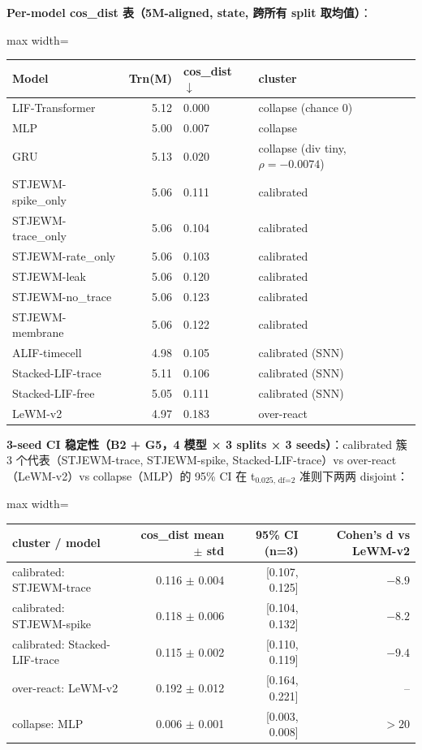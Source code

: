 \documentclass[11pt,a4paper]{article}
\begin{document}
\textbf{Per-model cos\_dist 表（5M-aligned, state, 跨所有 split 取均值）}：

\begin{adjustbox}{max width=\textwidth}
\scriptsize
\begin{tabular}{lrll}
\toprule
\textbf{Model} & \textbf{Trn(M)} & \textbf{cos\_dist $\downarrow$} & \textbf{cluster} \\
\midrule
LIF-Transformer & 5.12 & 0.000 & collapse (chance 0) \\
MLP & 5.00 & 0.007 & collapse \\
GRU & 5.13 & 0.020 & collapse (div tiny, $\rho=-0.0074$) \\
\midrule
STJEWM-spike\_only & 5.06 & 0.111 & calibrated \\
STJEWM-trace\_only & 5.06 & 0.104 & calibrated \\
STJEWM-rate\_only & 5.06 & 0.103 & calibrated \\
STJEWM-leak & 5.06 & 0.120 & calibrated \\
STJEWM-no\_trace & 5.06 & 0.123 & calibrated \\
STJEWM-membrane & 5.06 & 0.122 & calibrated \\
ALIF-timecell & 4.98 & 0.105 & calibrated (SNN) \\
Stacked-LIF-trace & 5.11 & 0.106 & calibrated (SNN) \\
Stacked-LIF-free & 5.05 & 0.111 & calibrated (SNN) \\
\midrule
LeWM-v2 & 4.97 & 0.183 & over-react \\
\bottomrule
\end{tabular}
\end{adjustbox}

\textbf{3-seed CI 稳定性（B2 + G5，4 模型 × 3 splits × 3 seeds）}：calibrated 簇 3 个代表（STJEWM-trace, STJEWM-spike, Stacked-LIF-trace）vs over-react（LeWM-v2）vs collapse（MLP）的 95\% CI 在 t$_{\text{0.025, df=2}}$ 准则下两两 disjoint：

\begin{adjustbox}{max width=\textwidth}
\scriptsize
\begin{tabular}{lrrr}
\toprule
\textbf{cluster / model} & \textbf{cos\_dist mean $\pm$ std} & \textbf{95\% CI (n=3)} & \textbf{Cohen's d vs LeWM-v2} \\
\midrule
calibrated: STJEWM-trace & 0.116 $\pm$ 0.004 & [0.107, 0.125] & $-8.9$ \\
calibrated: STJEWM-spike & 0.118 $\pm$ 0.006 & [0.104, 0.132] & $-8.2$ \\
calibrated: Stacked-LIF-trace & 0.115 $\pm$ 0.002 & [0.110, 0.119] & $-9.4$ \\
over-react: LeWM-v2 & 0.192 $\pm$ 0.012 & [0.164, 0.221] & -- \\
collapse: MLP & 0.006 $\pm$ 0.001 & [0.003, 0.008] & $>20$ \\
\bottomrule
\end{tabular}
\end{adjustbox}
\end{document}
